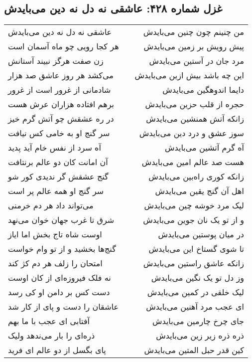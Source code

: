 \begin{center}
\section*{غزل شماره ۴۲۸: عاشقی نه دل نه دین می‌بایدش}
\label{sec:428}
\begin{longtable}{l p{0.5cm} r}
عاشقی نه دل نه دین می‌بایدش
&&
من چنینم چون چنین می‌بایدش
\\
هر کجا رویی چو ماه آسمان است
&&
پیش رویش بر زمین می‌بایدش
\\
زن صفت هرگز نبیند آستانش
&&
مرد جان در آستین می‌بایدش
\\
می‌کشد هر روز عاشق صد هزار
&&
این چه باشد بیش ازین می‌بایدش
\\
شادمانی از غرور است از غرور
&&
دایما اندوهگین می‌بایدش
\\
برهم افتاده هزاران عرش هست
&&
حجره از قلب حزین می‌بایدش
\\
در ره عشقش چو آتش گرم خیز
&&
زانکه آتش همنشین می‌بایدش
\\
سر گنج او به خامی کس نیافت
&&
سوز عشق و درد دین می‌بایدش
\\
آه سرد از نفس خام آید پدید
&&
آه گرم آتشین می‌بایدش
\\
آن امانت کان دو عالم برنتافت
&&
هست صد عالم امین می‌بایدش
\\
گنج عشقش گر ندیدی کور شو
&&
زانکه کوری راه‌بین می‌بایدش
\\
سر گنج او همه عالم پر است
&&
اهل آن گنج یقین می‌بایدش
\\
می‌تواند داد هر دم خرمنی
&&
لیک مرد خوشه چین می‌بایدش
\\
شرق تا غرب جهان خوان می‌نهد
&&
و از تو یک نان جوین می‌بایدش
\\
اوست شاه تاج بخش اما ایاز
&&
در میان پوستین می‌بایدش
\\
گنج‌ها بخشید و از تو وام خواست
&&
تا شوی گستاخ این می‌بایدش
\\
امتحان را زلف هر دم کژ کند
&&
زانکه عاشق راستین می‌بایدش
\\
نه فلک فیروزه‌ای از کان اوست
&&
وز دل تو یک نگین می‌بایدش
\\
دست کس بر دامن او کی رسد
&&
لیک خلقی در کمین می‌بایدش
\\
عاشقان را دست و پای از کار شد
&&
ای عجب مرد آهنین می‌بایدش
\\
آفتابی ای عجب با ما بهم
&&
جای چرخ چارمین می‌بایدش
\\
ذره‌ای را بار می‌ندهد ولیک
&&
ذره ذره زیر زین می‌بایدش
\\
پای بگسل از دو عالم ای فرید
&&
کین قدر حبل المتین می‌بایدش
\\
\end{longtable}
\end{center}
